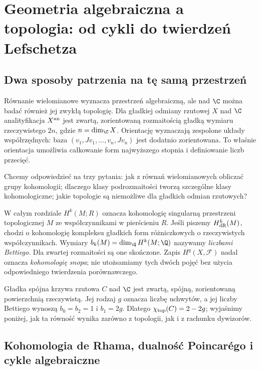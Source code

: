 \chapter{Geometria algebraiczna a topologia: od cykli do twierdzeń Lefschetza}
\label{ch:ga10-topologia}

\section{Dwa sposoby patrzenia na tę samą przestrzeń}
\label{sec:ga10-punkt-wyjscia}

Równanie wielomianowe wyznacza przestrzeń algebraiczną, ale nad $\C$
można badać również jej zwykłą topologię. Dla gładkiej odmiany
rzutowej $X$ nad $\C$ analityfikacja $X^{\rm an}$ jest zwartą,
zorientowaną rozmaitością gładką wymiaru rzeczywistego $2n$,
gdzie $n=\dim_{\C}X$. Orientację wyznaczają zespolone układy
współrzędnych: baza $(v_1,Jv_1,\ldots,v_n,Jv_n)$ jest dodatnio
zorientowana. To właśnie orientacja umożliwia całkowanie form
najwyższego stopnia i definiowanie liczb przecięć.

Chcemy odpowiedzieć na trzy pytania: jak z równań wielomianowych
obliczać grupy kohomologii; dlaczego klasy podrozmaitości tworzą
szczególne klasy kohomologiczne; jakie topologie są niemożliwe
dla gładkich odmian rzutowych?

W całym rozdziale $H^k(M;R)$ oznacza kohomologię singularną
przestrzeni topologicznej $M$ ze współczynnikami w pierścieniu $R$.
Jeśli piszemy $H^k_{\rm dR}(M)$, chodzi o kohomologię kompleksu
gładkich form różniczkowych o rzeczywistych współczynnikach.
Wymiary $b_k(M)=\dim_{\Q}H^k(M;\Q)$ nazywamy \emph{liczbami Bettiego}.
Dla zwartej rozmaitości są one skończone. Zapis $H^q(X,\mathcal F)$
nadal oznacza \emph{kohomologię snopa}; nie utożsamiamy tych dwóch
pojęć bez użycia odpowiedniego twierdzenia porównawczego.

\begin{przyklad}
Gładka spójna krzywa rzutowa $C$ nad $\C$ jest zwartą, spójną,
zorientowaną powierzchnią rzeczywistą. Jej rodzaj $g$ oznacza liczbę
uchwytów, a jej liczby Bettiego wynoszą $b_0=b_2=1$ i $b_1=2g$.
Dlatego $\chi_{\rm top}(C)=2-2g$; wyjaśnimy poniżej, jak ta
równość wynika zarówno z topologii, jak i z rachunku dywizorów.
\end{przyklad}

\section{Kohomologia de Rhama, dualność Poincarégo i cykle algebraiczne}
\label{sec:ga10-de-rham}

